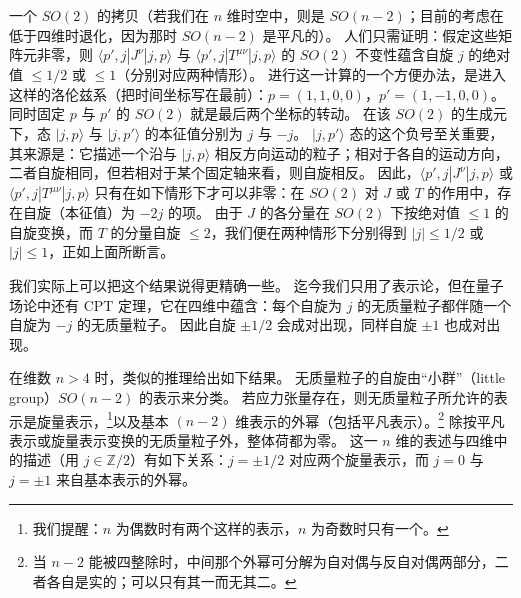 一个 $SO(2)$ 的拷贝（若我们在 $n$ 维时空中，则是 $SO(n-2)$；目前的考虑在低于四维时退化，因为那时 $SO(n-2)$ 是平凡的）。
人们只需证明：假定这些矩阵元非零，则 $\langle p',j|J^\nu|j,p\rangle$ 与 $\langle p',j|T^{\mu\nu}|j,p\rangle$ 的 $SO(2)$ 不变性蕴含自旋 $j$ 的绝对值 $\le 1/2$ 或 $\le 1$（分别对应两种情形）。
进行这一计算的一个方便办法，是进入这样的洛伦兹系（把时间坐标写在最前）：$p=(1,1,0,0)$，$p'=(1,-1,0,0)$。
同时固定 $p$ 与 $p'$ 的 $SO(2)$ 就是最后两个坐标的转动。
在该 $SO(2)$ 的生成元下，态 $|j,p\rangle$ 与 $|j,p'\rangle$ 的本征值分别为 $j$ 与 $-j$。
$|j,p'\rangle$ 态的这个负号至关重要，其来源是：它描述一个沿与 $|j,p\rangle$ 相反方向运动的粒子；相对于各自的运动方向，二者自旋相同，但若相对于某个固定轴来看，则自旋相反。
因此，$\langle p',j|J^\nu|j,p\rangle$ 或 $\langle p',j|T^{\mu\nu}|j,p\rangle$ 只有在如下情形下才可以非零：在 $SO(2)$ 对 $J$ 或 $T$ 的作用中，存在自旋（本征值）为 $-2j$ 的项。
由于 $J$ 的各分量在 $SO(2)$ 下按绝对值 $\le 1$ 的自旋变换，而 $T$ 的分量自旋 $\le 2$，我们便在两种情形下分别得到 $|j|\le 1/2$ 或 $|j|\le 1$，正如上面所断言。


我们实际上可以把这个结果说得更精确一些。
迄今我们只用了表示论，但在量子场论中还有 CPT 定理，它在四维中蕴含：每个自旋为 $j$ 的无质量粒子都伴随一个自旋为 $-j$ 的无质量粒子。
因此自旋 $\pm1/2$ 会成对出现，同样自旋 $\pm1$ 也成对出现。


在维数 $n>4$ 时，类似的推理给出如下结果。
无质量粒子的自旋由“小群”（little group）$SO(n-2)$ 的表示来分类。
若应力张量存在，则无质量粒子所允许的表示是旋量表示，\footnote{我们提醒：$n$ 为偶数时有两个这样的表示，$n$ 为奇数时只有一个。}以及基本 $(n-2)$ 维表示的外幂（包括平凡表示）。\footnote{当 $n-2$ 能被四整除时，中间那个外幂可分解为自对偶与反自对偶两部分，二者各自是实的；可以只有其一而无其二。}
除按平凡表示或旋量表示变换的无质量粒子外，整体荷都为零。
这一 $n$ 维的表述与四维中的描述（用 $j\in\mathbb{Z}/2$）有如下关系：$j=\pm1/2$ 对应两个旋量表示，而 $j=0$ 与 $j=\pm1$ 来自基本表示的外幂。

